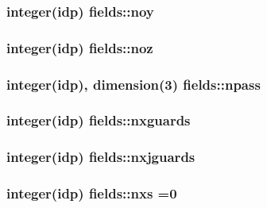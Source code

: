 \subsubsection[{\texorpdfstring{noy}{noy}}]{\setlength{\rightskip}{0pt plus 5cm}integer(idp) fields\+::noy}\hypertarget{namespacefields_ae0f614311e278825c771b1b6fa3d0596}{}\label{namespacefields_ae0f614311e278825c771b1b6fa3d0596}
\subsubsection[{\texorpdfstring{noz}{noz}}]{\setlength{\rightskip}{0pt plus 5cm}integer(idp) fields\+::noz}\hypertarget{namespacefields_a30badcbccf6fb02a7301a38cb9d27eff}{}\label{namespacefields_a30badcbccf6fb02a7301a38cb9d27eff}
\subsubsection[{\texorpdfstring{npass}{npass}}]{\setlength{\rightskip}{0pt plus 5cm}integer(idp), dimension(3) fields\+::npass}\hypertarget{namespacefields_ab87cdb3a2fad3969d058285da9197868}{}\label{namespacefields_ab87cdb3a2fad3969d058285da9197868}
\subsubsection[{\texorpdfstring{nxguards}{nxguards}}]{\setlength{\rightskip}{0pt plus 5cm}integer(idp) fields\+::nxguards}\hypertarget{namespacefields_a4ac76b76df65c6d646d63da6b1cd642c}{}\label{namespacefields_a4ac76b76df65c6d646d63da6b1cd642c}
\subsubsection[{\texorpdfstring{nxjguards}{nxjguards}}]{\setlength{\rightskip}{0pt plus 5cm}integer(idp) fields\+::nxjguards}\hypertarget{namespacefields_a775a9360ab07f232c9c55bf737fa25e4}{}\label{namespacefields_a775a9360ab07f232c9c55bf737fa25e4}
\subsubsection[{\texorpdfstring{nxs}{nxs}}]{\setlength{\rightskip}{0pt plus 5cm}integer(idp) fields\+::nxs =0}\hypertarget{namespacefields_a930a275ec3d0c2c725a19a016cf140f0}{}\label{namespacefields_a930a275ec3d0c2c725a19a016cf140f0}
